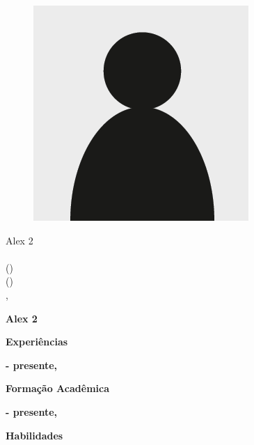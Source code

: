 \documentclass[a4paper,12pt,final]{memoir}
\newcommand{\Sep}{\vspace{1.5em}}
\newcommand{\SmallSep}{\vspace{0.5em}}
\newcommand{\CVSection}[1]
	{\Large\textbf{#1}\par
	\SmallSep\normalsize\normalfont}
\newcommand{\CVItem}[1]
	{\textbf{\color{RoyalBlue} #1}}
\begin{document}
\begin{figure}
	\hfill
	\includegraphics[width=0.6\columnwidth]{cv-photo.png}
	\vspace{-7cm}
\end{figure}

\begin{flushright}\small
	Alex 2\\ 
	\url{}  \\ 
() \\ 
() \\ 
\SmallSep
, \end{flushright}\normalsize
\framebreak



\Huge\bfseries {\color{RoyalBlue} Alex 2} \\ 

\normalsize\normalfont


\CVSection{Experiências}
\CVItem{ - presente, } \\ 

\Sep

\CVSection{Formação Acadêmica}
\CVItem{ - presente, } \\ 

\Sep


\CVSection{Habilidades}
\CVItem{}
\begin{compactitem}[\color{RoyalBlue}$\circ$]
\item 
\end{compactitem}
\Sep


\end{document}
